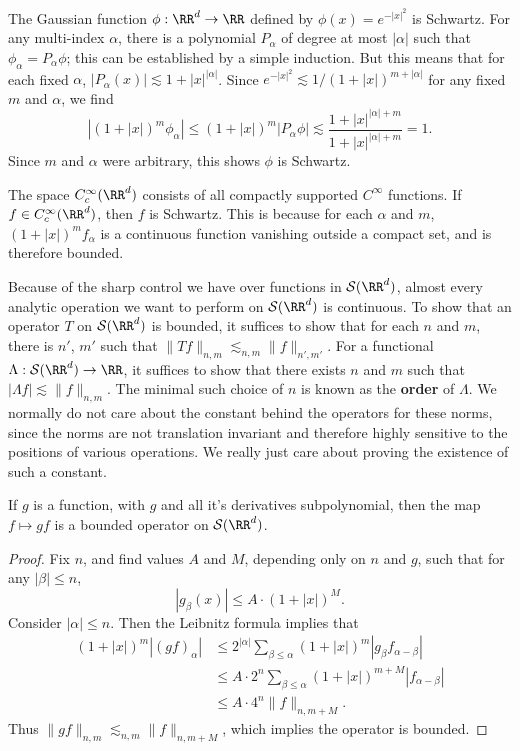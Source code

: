 \begin{example}
    The Gaussian function $\phi: \RR^d \to \RR$ defined by $\phi(x) = e^{-|x|^2}$ is Schwartz. For any multi-index $\alpha$, there is a polynomial $P_\alpha$ of degree at most $|\alpha|$ such that $\phi_\alpha = P_\alpha \phi$; this can be established by a simple induction. But this means that for each fixed $\alpha$, $|P_\alpha(x)| \lesssim 1 + |x|^{|\alpha|}$. Since $e^{-|x|^2} \lesssim 1/(1 + |x|)^{m + |\alpha|}$ for any fixed $m$ and $\alpha$, we find
    \[ | (1 + |x|)^m \phi_\alpha| \leq (1 + |x|)^m |P_\alpha \phi| \lesssim \frac{1 + |x|^{|\alpha| + m}}{1 + |x|^{|\alpha| + m}} = 1. \]
    Since $m$ and $\alpha$ were arbitrary, this shows $\phi$ is Schwartz.
\end{example}

\begin{example}
    The space $C^\infty_c(\RR^d)$ consists of all compactly supported $C^\infty$ functions. If $f \in C^\infty_c(\RR^d)$, then $f$ is Schwartz. This is because for each $\alpha$ and $m$, $(1 + |x|)^m f_\alpha$ is a continuous function vanishing outside a compact set, and is therefore bounded.
\end{example} 

Because of the sharp control we have over functions in $\mathcal{S}(\RR^d)$, almost every analytic operation we want to perform on $\mathcal{S}(\RR^d)$ is continuous. To show that an operator $T$ on $\mathcal{S}(\RR^d)$ is bounded, it suffices to show that for each $n$ and $m$, there is $n'$, $m'$ such that $\| Tf \|_{n,m} \lesssim_{n,m} \| f \|_{n',m'}$. For a functional $\Lambda: \mathcal{S}(\RR^d) \to \RR$, it suffices to show that there exists $n$ and $m$ such that $|\Lambda f| \lesssim \| f \|_{n,m}$. The minimal such choice of $n$ is known as the {\bf order} of $\Lambda$. We normally do not care about the constant behind the operators for these norms, since the norms are not translation invariant and therefore highly sensitive to the positions of various operations. We really just care about proving the existence of such a constant.

\begin{lemma}
    If $g$ is a function, with $g$ and all it's derivatives subpolynomial, then the map $f \mapsto gf$ is a bounded operator on $\mathcal{S}(\RR^d)$.
\end{lemma}
\begin{proof}
    Fix $n$, and find values $A$ and $M$, depending only on $n$ and $g$, such that for any $|\beta| \leq n$,
    \[ |g_\beta(x)| \leq A \cdot (1 + |x|)^M. \]
    Consider $|\alpha| \leq n$. Then the Leibnitz formula implies that
    \begin{align*}
        (1 + |x|)^m |(gf)_\alpha| &\leq 2^{|\alpha|} \sum_{\beta \leq \alpha} (1 + |x|)^m |g_\beta f_{\alpha-\beta}|\\
        &\leq A \cdot 2^n \sum_{\beta \leq \alpha} (1 + |x|)^{m+M} |f_{\alpha-\beta}|\\
        &\leq A \cdot 4^n \| f \|_{n,m+M}.
    \end{align*}
    Thus $\| gf \|_{n,m} \lesssim_{n,m} \| f \|_{n,m+M}$, which implies the operator is bounded.
\end{proof}


